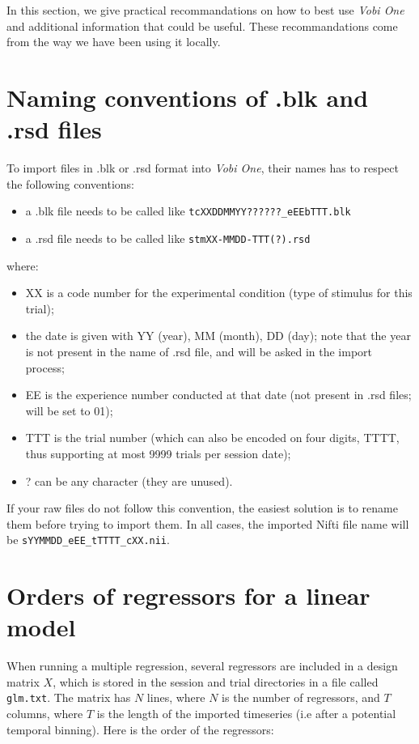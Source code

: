 In this section, we give practical recommandations on how to best use {\em Vobi One} and additional information that could be useful. These recommandations come from the way we have been using it locally.


\section{Naming conventions of .blk and .rsd files}

To import files in .blk or .rsd format into {\em Vobi One}, their names has to respect the following conventions:

\begin{itemize}
  \item a .blk file needs to be called like \texttt{tcXXDDMMYY??????\_eEEbTTT.blk}
  \item a .rsd file needs to be called like \texttt{stmXX-MMDD-TTT(?).rsd}
\end{itemize}

where:
\begin{itemize}
  \item XX is a code number for the experimental condition (type of stimulus for this trial);
  \item the date is given with YY (year), MM (month), DD (day); note that the year is not present in the name of .rsd file, and will be asked in the import process;
  \item EE is the experience number conducted at that date (not present in .rsd files; will be set to 01);
  \item TTT is the trial number (which can also be encoded on four digits, TTTT, thus supporting at most 9999 trials per session date);
  \item ? can be any character (they are unused).
\end{itemize}

If your raw files do not follow this convention, the easiest solution is to rename them before trying to import them. In all cases, the imported Nifti file name will be \texttt{sYYMMDD\_eEE\_tTTTT\_cXX.nii}. 

\section{Orders of regressors for a linear model}

When running a multiple regression, several regressors are included in a design matrix $X$, which is stored in the session and trial directories in a file called \texttt{glm.txt}. The matrix has $N$ lines, where $N$ is the number of regressors, and $T$ columns, where $T$ is the length of the imported timeseries (i.e after a potential temporal binning). Here is the order of the regressors:

